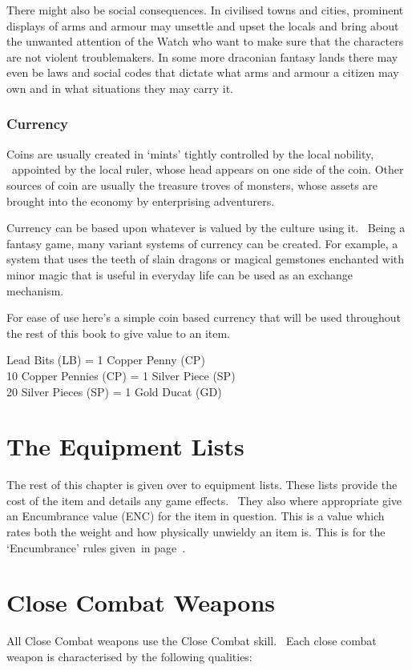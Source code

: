 There might also be social consequences. In civilised towns and cities, prominent displays of arms and armour may unsettle and upset the locals and bring about the unwanted attention of the Watch who want to make sure that the characters are not violent troublemakers. In some more draconian fantasy lands there may even be laws and social codes that dictate what arms and armour a citizen may own and in what situations they may carry it. 

\subsubsection{Currency}
Coins are usually created in ‘mints’ tightly controlled by the local nobility,  appointed by the local ruler, whose head appears on one side of the coin. Other sources of coin are usually the treasure troves of monsters, whose assets are brought into the economy by enterprising adventurers.

Currency can be based upon whatever is valued by the culture using it.  Being a fantasy game, many variant systems of currency can be created. For example, a system that uses the teeth of slain dragons or magical gemstones enchanted with minor magic that is useful in everyday life can be used as an exchange mechanism.

For ease of use here’s a simple coin based currency that will be used throughout the rest of this book to give value to an item.

\begin{rpg-table}[|X|]
	 Lead Bits (LB) = 1 Copper Penny (CP)\\
	10 Copper Pennies (CP) = 1 Silver Piece (SP)\\
	20 Silver Pieces (SP) = 1 Gold Ducat (GD)\\
	\hline
\end{rpg-table}

\section{The Equipment Lists}
The rest of this chapter is given over to equipment lists. These lists provide the cost of the item and details any game effects.  They also where appropriate give an Encumbrance value (ENC) for the item in question. This is a value which rates both the weight and how physically unwieldy an item is. This is for the `Encumbrance' rules given in page~\pageref{ssec:encumbrance}.

\section{Close Combat Weapons}
All Close Combat weapons use the Close Combat skill.  Each close combat weapon is characterised by the following qualities: 

